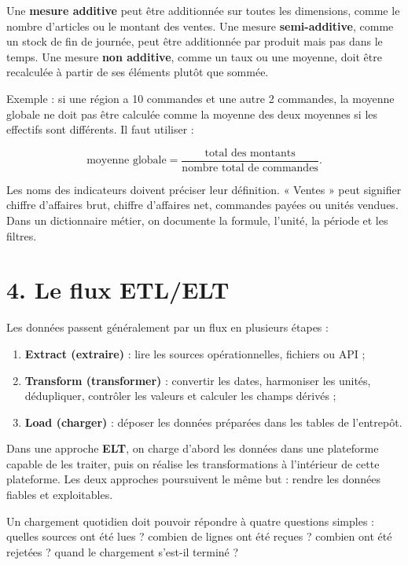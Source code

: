 \documentclass[
  french,
  letterpaper,
  open=any]{scrbook}
\providecommand{\tightlist}{%
  \setlength{\itemsep}{0pt}\setlength{\parskip}{0pt}}
\theoremstyle{definition}
\theoremstyle{definition}
\theoremstyle{remark}
\begin{document}
Une \textbf{mesure additive} peut être additionnée sur toutes les
dimensions, comme le nombre d'articles ou le montant des ventes. Une
mesure \textbf{semi-additive}, comme un stock de fin de journée, peut
être additionnée par produit mais pas dans le temps. Une mesure
\textbf{non additive}, comme un taux ou une moyenne, doit être
recalculée à partir de ses éléments plutôt que sommée.

Exemple : si une région a 10 commandes et une autre 2 commandes, la
moyenne globale ne doit pas être calculée comme la moyenne des deux
moyennes si les effectifs sont différents. Il faut utiliser :

\[
\text{moyenne globale} =
\frac{\text{total des montants}}{\text{nombre total de commandes}}.
\]

Les noms des indicateurs doivent préciser leur définition. « Ventes »
peut signifier chiffre d'affaires brut, chiffre d'affaires net,
commandes payées ou unités vendues. Dans un dictionnaire métier, on
documente la formule, l'unité, la période et les filtres.

\section{4. Le flux ETL/ELT}\label{le-flux-etlelt}

Les données passent généralement par un flux en plusieurs étapes :

\begin{enumerate}
\def\labelenumi{\arabic{enumi}.}
\tightlist
\item
  \textbf{Extract (extraire)} : lire les sources opérationnelles,
  fichiers ou API ;
\item
  \textbf{Transform (transformer)} : convertir les dates, harmoniser les
  unités, dédupliquer, contrôler les valeurs et calculer les champs
  dérivés ;
\item
  \textbf{Load (charger)} : déposer les données préparées dans les
  tables de l'entrepôt.
\end{enumerate}

Dans une approche \textbf{ELT}, on charge d'abord les données dans une
plateforme capable de les traiter, puis on réalise les transformations à
l'intérieur de cette plateforme. Les deux approches poursuivent le même
but : rendre les données fiables et exploitables.

Un chargement quotidien doit pouvoir répondre à quatre questions simples
: quelles sources ont été lues ? combien de lignes ont été reçues ?
combien ont été rejetées ? quand le chargement s'est-il terminé ?
\end{document}
